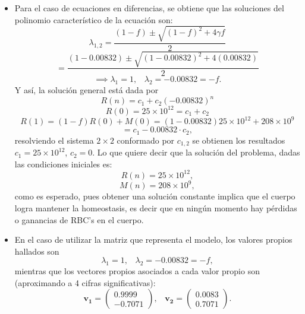 \begin{itemize}
    \item Para el caso de ecuaciones en diferencias, se obtiene que las soluciones del polinomio característico de la ecuación son:
        $$\lambda_{1,2}=\dfrac{(1-f)\pm\sqrt{(1-f)^2+4\gamma f}}{2}$$
        $$=\dfrac{(1-0.00832)\pm \sqrt{(1-0.00832)^2+4(0.00832)}}{2}$$
        $$\implies \lambda_1 = 1,\;\;\; \lambda_2 = -0.00832=-f.$$
        Y así, la solución general está dada por 
        $$R(n)=c_1+c_2(-0.00832)^n$$
        $$R(0)=25\times 10^{12}=c_1+c_2$$
        $$R(1)=(1-f)R(0)+M(0)=(1-0.00832)25 \times 10^{12}+208\times 10^9$$
        $$=c_1-0.00832\cdot c_2,$$
        resolviendo el sistema $2\times 2$ conformado por $c_{1,2}$ se obtienen los resultados $c_1=25\times 10^{12}$, $c_2 = 0$. Lo que quiere decir que la solución del problema, dadas las condiciones iniciales es:
        $$R(n)=25\times 10^{12},$$
        $$M(n)=208\times 10^{9},$$
        como es esperado, pues obtener una solución constante implica que el cuerpo logra mantener la homeostasis, es decir que en ningún momento hay pérdidas o ganancias de RBC's en el cuerpo.
    \item En el caso de utilizar la matriz que representa el modelo, los valores propios hallados son
        $$\lambda_1 = 1, \;\;\; \lambda_2 = -0.00832=-f,$$
        mientras que los vectores propios asociados a cada valor propio son (aproximando a 4 cifras significativas):
        $$\mathbf{v_1}=\begin{pmatrix}
            0.9999  \\
            -0.7071
            \end{pmatrix},\;\;\;  \mathbf{v_2}=\begin{pmatrix}
            0.0083 \\
            0.7071
            \end{pmatrix}.$$

\end{itemize}

